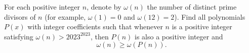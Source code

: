 For each positive integer $n$, denote by $\omega(n)$ the number of distinct prime divisors of $n$ (for example, $\omega(1)=0$ and $\omega(12)=2$). Find all polynomials $P(x)$ with integer coefficients such that whenever $n$ is a positive integer satisfying $\omega(n)>2023^{2023}$, then $P(n)$ is also a positive integer and
$$
\omega(n)\geq\omega(P(n)).
$$